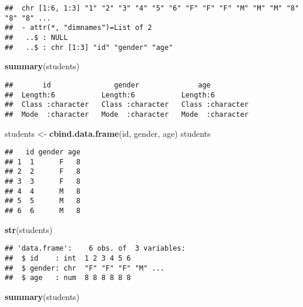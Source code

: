 \documentclass[
  a4paper,
]{article}
\newenvironment{Shaded}{\begin{snugshade}}{\end{snugshade}}
\newcommand{\FunctionTok}[1]{\textcolor[rgb]{0.13,0.29,0.53}{\textbf{#1}}}
\newcommand{\NormalTok}[1]{#1}
\newcommand{\OtherTok}[1]{\textcolor[rgb]{0.56,0.35,0.01}{#1}}
\begin{document}
\begin{verbatim}
##  chr [1:6, 1:3] "1" "2" "3" "4" "5" "6" "F" "F" "F" "M" "M" "M" "8" "8" "8" ...
##  - attr(*, "dimnames")=List of 2
##   ..$ : NULL
##   ..$ : chr [1:3] "id" "gender" "age"
\end{verbatim}

\begin{Shaded}
\begin{Highlighting}[]
\FunctionTok{summary}\NormalTok{(students)}
\end{Highlighting}
\end{Shaded}

\begin{verbatim}
##       id               gender              age           
##  Length:6           Length:6           Length:6          
##  Class :character   Class :character   Class :character  
##  Mode  :character   Mode  :character   Mode  :character
\end{verbatim}

\begin{Shaded}
\begin{Highlighting}[]
\NormalTok{students }\OtherTok{\textless{}{-}} \FunctionTok{cbind.data.frame}\NormalTok{(id, gender, age)}
\NormalTok{students}
\end{Highlighting}
\end{Shaded}

\begin{verbatim}
##   id gender age
## 1  1      F   8
## 2  2      F   8
## 3  3      F   8
## 4  4      M   8
## 5  5      M   8
## 6  6      M   8
\end{verbatim}

\begin{Shaded}
\begin{Highlighting}[]
\FunctionTok{str}\NormalTok{(students)}
\end{Highlighting}
\end{Shaded}

\begin{verbatim}
## 'data.frame':    6 obs. of  3 variables:
##  $ id    : int  1 2 3 4 5 6
##  $ gender: chr  "F" "F" "F" "M" ...
##  $ age   : num  8 8 8 8 8 8
\end{verbatim}

\begin{Shaded}
\begin{Highlighting}[]
\FunctionTok{summary}\NormalTok{(students)}
\end{Highlighting}
\end{Shaded}
\end{document}
